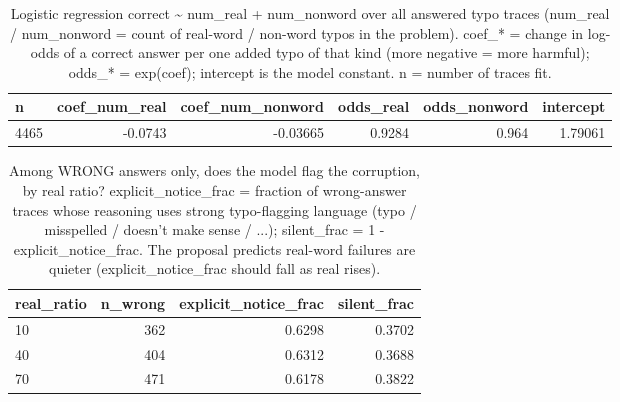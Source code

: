 \documentclass[11pt]{article}
\begin{document}
\begin{table}[H]
\centering
\caption{Logistic regression correct \textasciitilde{} num\_real + num\_nonword over all answered typo traces (num\_real / num\_nonword = count of real-word / non-word typos in the problem). coef\_* = change in log-odds of a correct answer per one added typo of that kind (more negative = more harmful); odds\_* = exp(coef); intercept is the model constant. n = number of traces fit.}
\small
\begin{adjustbox}{max width=\textwidth}
\begin{tabular}{lrrrrr}
\toprule
\textbf{n} & \textbf{coef\_num\_real} & \textbf{coef\_num\_nonword} & \textbf{odds\_real} & \textbf{odds\_nonword} & \textbf{intercept} \\
\midrule
4465 & -0.0743 & -0.03665 & 0.9284 & 0.964 & 1.79061 \\
\bottomrule
\end{tabular}
\end{adjustbox}
\end{table}

\begin{table}[H]
\centering
\caption{Among WRONG answers only, does the model flag the corruption, by real ratio? explicit\_notice\_frac = fraction of wrong-answer traces whose reasoning uses strong typo-flagging language (typo / misspelled / doesn't make sense / ...); silent\_frac = 1 - explicit\_notice\_frac. The proposal predicts real-word failures are quieter (explicit\_notice\_frac should fall as real rises).}
\small
\begin{adjustbox}{max width=\textwidth}
\begin{tabular}{lrrr}
\toprule
\textbf{real\_ratio} & \textbf{n\_wrong} & \textbf{explicit\_notice\_frac} & \textbf{silent\_frac} \\
\midrule
10 & 362 & 0.6298 & 0.3702 \\
40 & 404 & 0.6312 & 0.3688 \\
70 & 471 & 0.6178 & 0.3822 \\
\bottomrule
\end{tabular}
\end{adjustbox}
\end{table}
\end{document}
